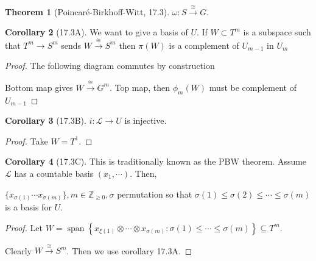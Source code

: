 \documentclass{article}
\theoremstyle{definition}
\newtheorem{theorem}{Theorem}
\newtheorem{corollary}[theorem]{Corollary}
\begin{document}
    \begin{theorem}
        [Poincar\'e-Birkhoff-Witt, 17.3] \(\omega: S \xrightarrow{\cong} G\).
    \end{theorem}

    \begin{corollary}
        [17.3A] We want to give a basis of \(U\). If \(W \subset T^m\) is a subspace such that \(T^m \to S^m\) sends \(W \xrightarrow{\cong} S^m\) then \(\pi(W)\) is a complement of \(U_{m-1}\) in \(U_m\)
    \end{corollary}

    \begin{proof}

        The following diagram commutes by construction

        \begin{center}
        \end{center}

        Bottom map gives \(W\xrightarrow{\cong} G^m\). Top map, then \(\phi_m(W)\) must be complement of \(U_{m-1}\)
    \end{proof}

    \begin{corollary}
        [17.3B] \(i: \mathcal{L} \to U\) is injective.
    \end{corollary}

    \begin{proof}
        Take \(W = T^1\).
    \end{proof}

    \begin{corollary}
        [17.3C] This is traditionally known as the PBW theorem. Assume \(\mathcal{L}\) has a countable basis \((x_1, \cdots)\). Then,

        \(\{x_{\sigma(1)}\cdots x_{\sigma(m)}\}, m\in \mathbb{Z}_{\geq 0}, \sigma\) permutation so that \(\sigma(1) \leq  \sigma(2) \leq \cdots \leq \sigma(m)\) is a basis for \(U\).
    \end{corollary}

    \begin{proof}
        Let \(W = \operatorname{span}\left\{ x_{\xi(1)} \otimes \cdots \otimes x_{\sigma(m)}: \sigma(1) \leq  \cdots \leq \sigma(m) \right\} \subseteq T^m\).
        
        Clearly \(W \xrightarrow{\cong} S^m\). Then we use corollary 17.3A. 
    \end{proof}
\end{document}

